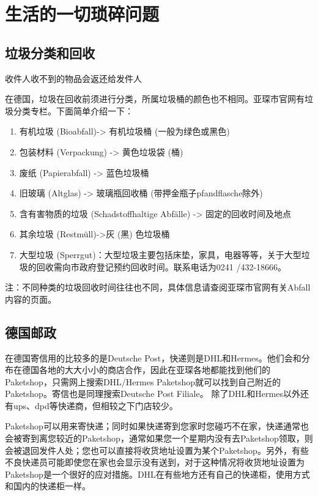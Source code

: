\section{生活的一切琐碎问题}

  \subsection{垃圾分类和回收}

    收件人收不到的物品会返还给发件人

    在德国，垃圾在回收前须进行分类，所属垃圾桶的颜色也不相同。亚琛市官网有垃圾分类专栏。下面简单介绍一下：

    \begin{enumerate}
      \item 有机垃圾 (Bioabfall)-> 有机垃圾桶 (一般为绿色或黑色)
      \item 包装材料 (Verpackung) -> 黄色垃圾袋 (桶)
      \item 废纸 (Papierabfall) -> 蓝色垃圾桶
      \item 旧玻璃 (Altglas) -> 玻璃瓶回收桶 (带押金瓶子pfandflasche除外)
      \item 含有害物质的垃圾 (Schadstoffhaltige Abfälle) -> 固定的回收时间及地点
      \item 其余垃圾 (Restmüll)->灰 (黑) 色垃圾桶
      \item 大型垃圾 (Sperrgut)：大型垃圾主要包括床垫，家具，电器等等，关于大型垃圾的回收需向市政府登记预约回收时间。联系电话为0241 /432-18666。
    \end{enumerate}

    注：不同种类的垃圾回收时间往往也不同，具体信息请查阅亚琛市官网有关Abfall内容的页面。

  \subsection{德国邮政}

    在德国寄信用的比较多的是Deutsche Post，快递则是DHL和Hermes。他们会和分布在德国各地的大大小小的商店合作，因此在亚琛各地都能找到他们的Paketshop，只需网上搜索DHL/Hermes Paketshop就可以找到自己附近的Paketshop。寄信也是同理搜索Deutsche Post Filiale。 除了DHL和Hermes以外还有ups、dpd等快递商，但相较之下门店较少。

    Paketshop可以用来寄快递；同时如果快递寄到您家时您碰巧不在家，快递通常也会被寄到离您较近的Paketshop，通常如果您一个星期内没有去Paketshop领取，则会被退回发件人处；您也可以直接将收货地址设置为某个Paketshop。另外，有些不良快递员可能即使您在家也会显示没有送到，对于这种情况将收货地址设置为Paketshop是一个很好的应对措施。DHL在有些地方还有自己的快递柜，使用方式和国内的快递柜一样。

